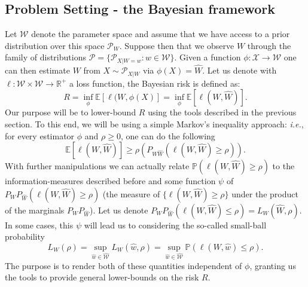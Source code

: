 \documentclass[conference]{IEEEtran}
\theoremstyle{plain}
\theoremstyle{definition}
\theoremstyle{remark}
\begin{document}
\subsection{Problem Setting - the Bayesian framework} \label{sec:bayesianFramework}
Let $\mathcal{W}$ denote the parameter space and assume that we have access to a prior distribution over this space $\mathcal{P}_W$. Suppose then that we observe $W$ through the family of distributions $\mathcal{P}= \{ \mathcal{P}_{X|W=w}: w\in\mathcal{W} \}.$ Given a function $\phi:\mathcal{X}\to\mathcal{W}$ one can then estimate $W$ from $X\sim \mathcal{P}_{X|W}$ via $\phi(X)=\hat{W}$. Let us denote with $\ell:\mathcal{W}\times\mathcal{W}\to \mathbb{R}^+$ a loss function, the Bayesian risk is defined as:
\begin{equation}
    R = \inf_\phi\mathbb{E}[\ell(W,\phi(X)] = \inf_\phi\mathbb{E}[\ell(W,\hat{W})].\label{risk}
\end{equation}
Our purpose will be to lower-bound $R$ using the tools described in the previous section. To this end, we will be using a simple Markov's inequality approach: \textit{i.e.}, for every estimator $\phi$ and $\rho \geq 0$, one can do the following
\begin{equation}
    \mathbb{E}[\ell(W,\hat{W})] \geq \rho\left(P_{W\hat{W}}(\ell(W,\hat{W})\geq \rho)\right). \label{markov}
\end{equation}
With further manipulations we can actually relate $\mathbb{P}(\ell(W,\hat{W})\geq \rho)$ to the information-measures described before and some function $\psi$ of $P_WP_{\hat{W}}(\ell(W,\hat{W})\geq \rho)$ (the measure of $\{\ell(W,\hat{W})\geq \rho\}$ under the product of the marginals $P_WP_{\hat{W}}$).
Let us denote $P_W P_{\hat{W}}(\ell(W,\hat{W})\leq \rho)=L_W(\hat{W},\rho)$.
In some cases, this $\psi$ will lead us to considering
the so-called small-ball probability  \begin{equation}L_W(\rho)= \sup_{\hat{w}\in\mathcal{\hat{W}}} L_W(\hat{w},\rho) =  \sup_{\hat{w}\in\mathcal{\hat{W}}}\mathbb{P}(\ell(W,\hat{w})\leq \rho).\label{smallBall}\end{equation}
The purpose is to render both of these quantities independent of $\phi$, granting us the tools to provide general lower-bounds on the risk $R$.
\end{document}
